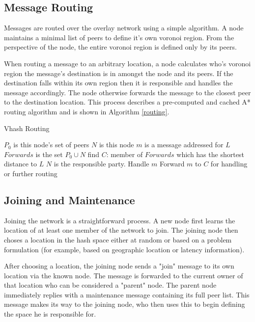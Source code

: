 \documentclass[11pt]{IEEEtran} %
\begin{document}
\subsection{Message Routing}
Messages are routed over the overlay network using a simple algorithm. A node maintains a minimal list of peers to define it's own voronoi region.  From the perspective of the node, the entire voronoi region is defined only by its peers.

When routing a message to an arbitrary location, a node calculates who's voronoi region the message's destination is in amongst the node and its peers. If the destination falls within its own region then it is responsible and handles the message accordingly. The node otherwise forwards the message to the closest peer to the destination location. This process describes a pre-computed and cached A* \cite{astar} routing algorithm and is shown in Algorithm \ref{routing}. 

\begin{algorithm}
\caption{Vhash Routing}
\label{routing}
\begin{algorithmic}[1]  %
	\STATE $P_0$ is this node's set of peers
    \STATE $N$ is this node
	\STATE $m$ is a message addressed for $L$
    \STATE $Forwards$ is the set $P_0\cup{}N$
    \STATE find $C$: member of $Forwards$ which has the shortest distance to $L$
    	\STATE $N$ is the responsible party.
        \STATE Handle $m$
    \ELSE
    	\STATE Forward $m$ to $C$ for handling or further routing
    \ENDIF
\end{algorithmic}
\end{algorithm}

\subsection{Joining and Maintenance}
Joining the network is a straightforward process. A new node first learns the location of at least one member of the network to join. The joining node then choses a location in the hash space either at random or based on a problem formulation (for example, based on geographic location or latency information).

After choosing a location, the joining node sends a "join" message to its own location via the known node.
The message is forwarded to the current owner of that location who can be considered a "parent" node.
The parent node immediately replies with a maintenance message containing its full peer list. This message makes its way to the joining node, who then uses this to begin defining the space he is responsible for. 
\end{document}
